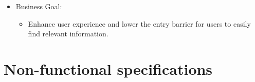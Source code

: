 \begin{enumerate}
\begin{itemize}
        \begin{itemize}
        \item
          All users have access to search and filter functionalities,
          although specific searchable content varies based on user
          permissions.
        \end{itemize}
      \item
        Business Goal:
    
        \begin{itemize}
        \item
          Enhance user experience and lower the entry barrier for users to
          easily find relevant information.
        \end{itemize}
      \end{itemize}
    \end{enumerate}

\section{Non-functional specifications}
\label{sect:non-functional-specifications}

